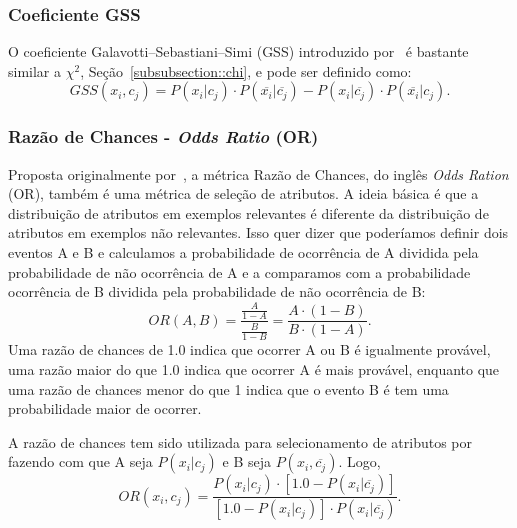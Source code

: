 \subsubsection{Coeficiente GSS}
\label{subsubsection::gss}
O coeficiente Galavotti–Sebastiani–Simi (GSS) introduzido por~\cite{Galavotti00} é bastante similar a $\chi^2$, Seção~\ref{subsubsection::chi}, e pode ser definido como:
\begin{equation}\label{eqn::gss}
   GSS(x_i, c_j) = P(x_i|c_j) \cdot P(\overline{x_i}|\overline{c_j}) - P(x_i|\overline{c_j}) \cdot P(\overline{x_i}|c_j).
\end{equation}


\subsubsection{Razão de Chances - \textit{Odds Ratio} (OR)}
\label{subsubsection::or}

Proposta originalmente por~\cite{Rijsbergen79}, a métrica Razão de Chances, do inglês \textit{Odds Ration} (OR), também é uma métrica de seleção de atributos. A ideia básica é que a distribuição de atributos em exemplos relevantes é diferente da distribuição de atributos em exemplos não relevantes. Isso quer dizer que poderíamos definir dois eventos A e B e calculamos a probabilidade de ocorrência de A dividida pela probabilidade de não ocorrência de A e a comparamos com a probabilidade ocorrência de B dividida pela probabilidade de não ocorrência de B:
\begin{equation}\label{eqn::or}
   OR(A, B) = \frac{\frac{A}{1-A}} {\frac{B}{1-B}} = \frac{ A \cdot ( 1 - B )} { B \cdot ( 1 - A ) } .
\end{equation}
Uma razão de chances de 1.0 indica que ocorrer A ou B é igualmente provável, uma razão maior do que 1.0 indica que ocorrer A é mais provável, enquanto que uma razão de chances menor do que 1 indica que o evento B é tem uma probabilidade maior de ocorrer.

A razão de chances tem sido utilizada para selecionamento de atributos por \cite{Mladenic98} fazendo com que A seja $P(x_i|c_j)$ e B seja $P(x_i,\overline{c_j})$. Logo,
\begin{equation}\label{eqn::or}
   OR(x_i, c_j) = \frac{ P(x_i|c_j) \cdot [ 1.0 - P(x_i|\overline{c_j}) ] }{ [ 1.0 - P(x_i|c_j) ] \cdot P(x_i|\overline{c_j})}.
\end{equation}


